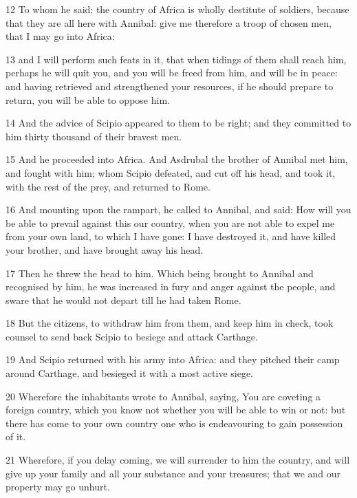 \par 12 To whom he said; the country of Africa is wholly destitute of soldiers, because that they are all here with Annibal: give me therefore a troop of chosen men, that I may go into Africa: 

\par 13 and I will perform such feats in it, that when tidings of them shall reach him, perhaps he will quit you, and you will be freed from him, and will be in peace: and having retrieved and strengthened your resources, if he should prepare to return, you will be able to oppose him. 

\par 14 And the advice of Scipio appeared to them to be right; and they committed to him thirty thousand of their bravest men. 

\par 15 And he proceeded into Africa. And Asdrubal the brother of Annibal met him, and fought with him; whom Scipio defeated, and cut off his head, and took it, with the rest of the prey, and returned to Rome. 

\par 16 And mounting upon the rampart, he called to Annibal, and said: How will you be able to prevail against this our country, when you are not able to expel me from your own land, to which I have gone: I have destroyed it, and have killed your brother, and have brought away his head. 

\par 17 Then he threw the head to him. Which being brought to Annibal and recognised by him, he was increased in fury and anger against the people, and sware that he would not depart till he had taken Rome. 

\par 18 But the citizens, to withdraw him from them, and keep him in check, took counsel to send back Scipio to besiege and attack Carthage. 

\par 19 And Scipio returned with his army into Africa: and they pitched their camp around Carthage, and besieged it with a most active siege. 

\par 20 Wherefore the inhabitants wrote to Annibal, saying, You are coveting a foreign country, which you know not whether you will be able to win or not: but there has come to your own country one who is endeavouring to gain possession of it. 

\par 21 Wherefore, if you delay coming, we will surrender to him the country, and will give up your family and all your substance and your treasures; that we and our property may go unhurt. 

